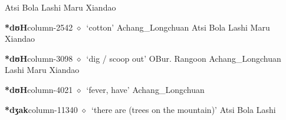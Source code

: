          Atsi 
\hspace{1ex}
         Bola 
\hspace{1ex}
         Lashi 
\hspace{1ex}
         Maru 
\hspace{1ex}
         Xiandao 
  \item {\footnotesize \textbf{*dʊH}}{\tiny column-2542}
         $\diamond$~`cotton'
         Achang\_Longchuan 
\hspace{1ex}
         Atsi 
\hspace{1ex}
         Bola 
\hspace{1ex}
         Lashi 
\hspace{1ex}
         Maru 
\hspace{1ex}
         Xiandao 
  \item {\footnotesize \textbf{*dʊH}}{\tiny column-3098}
         $\diamond$~`dig / scoop out'
         OBur. 
\hspace{1ex}
         Rangoon 
\hspace{1ex}
         Achang\_Longchuan 
\hspace{1ex}
         Lashi 
\hspace{1ex}
         Maru 
\hspace{1ex}
         Xiandao 
  \item {\footnotesize \textbf{*dʊH}}{\tiny column-4021}
         $\diamond$~`fever, have'
         Achang\_Longchuan 
  \item {\footnotesize \textbf{*dʒak}}{\tiny column-11340}
         $\diamond$~`there are (trees on the mountain)'
         Atsi 
\hspace{1ex}
         Bola 
\hspace{1ex}
         Lashi 
